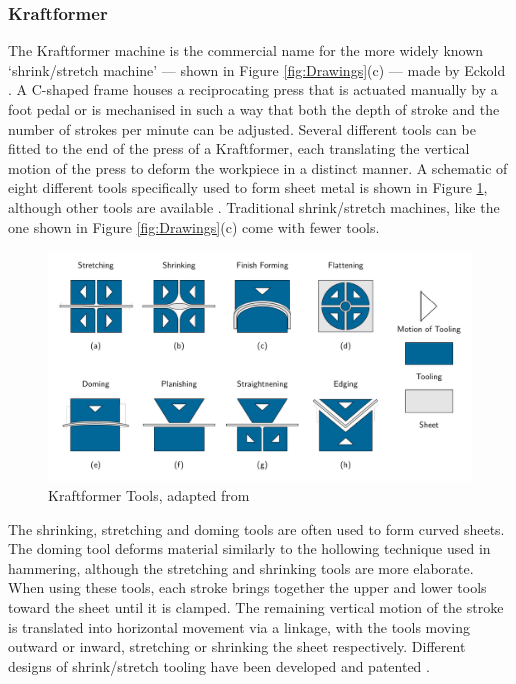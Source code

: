 \subsubsection{Kraftformer} \label{sec:ManualKraftformer}

The Kraftformer machine is the commercial name for the more widely known `shrink/stretch machine' --- shown in Figure \ref{fig:Drawings}(c) --- made by Eckold \citep{Unknown2020ECKOLDBrochure}. A C-shaped frame houses a reciprocating press that is actuated manually by a foot pedal or is mechanised in such a way that both the depth of stroke and the number of strokes per minute can be adjusted. Several different tools can be fitted to the end of the press of a Kraftformer, each translating the vertical motion of the press to deform the workpiece in a distinct manner. A schematic of eight different tools specifically used to form sheet metal is shown in Figure \ref{fig:Kraftformer}, although other tools are available \citep{Unknown2020ECKOLDBrochure}. Traditional shrink/stretch machines, like the one shown in Figure \ref{fig:Drawings}(c) come with fewer tools.

\begin{figure}[h]
    \centering
    \includegraphics[width=0.7\linewidth]{Images/KraftformingTools4x2S.pdf}
    \caption{Kraftformer Tools, adapted from \citep{Unknown2020ECKOLDBrochure}}
    \label{fig:Kraftformer}
\end{figure}

The shrinking, stretching and doming tools are often used to form curved sheets. The doming tool deforms material similarly to the hollowing technique used in hammering, although the stretching and shrinking tools are more elaborate. When using these tools, each stroke brings together the upper and lower tools toward the sheet until it is clamped. The remaining vertical motion of the stroke is translated into horizontal movement via a linkage, with the tools moving outward or inward, stretching or shrinking the sheet respectively. Different designs of shrink/stretch tooling have been developed and patented \citep{Joyner1943SheetMachine,Rusch2011ShrinkerMachine,Eckold1950ToolElements,EckoldWalter1954ApparatusProfiles}.

